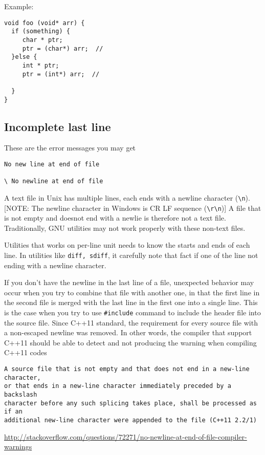 Example:
\begin{verbatim}
void foo (void* arr) {
  if (something) {
     char * ptr;  
     ptr = (char*) arr;  //
  }else {
     int * ptr;  
     ptr = (int*) arr;  //
  
  }
}
\end{verbatim}

\subsection{Incomplete last line}


These are the error messages you may get
\begin{verbatim}
No new line at end of file

\ No newline at end of file
\end{verbatim}

A text file in Unix has multiple lines, each ends with a newline character
(\verb!\n!). [NOTE: The newline character in Windows is CR LF sequence
(\verb!\r\n!)] A file that is not empty and doesnot end with a newlie is
therefore not a text file. Traditionally, GNU utilities may not work properly with these non-text files.

Utilities that works on per-line unit needs to know the starts and ends of each
line. In utilities like \verb!diff, sdiff!, it carefully note that fact if one
of the line not ending with a newline character. 

If you don't have the newline in the last line of a file, unexpected behavior
may occur when you try to combine that file with another one, in that the first
line in the second file is merged with the last line in the first one into a
single line. This is the case when you try to use \verb!#include! command to
include the header file into the source file. Since C++11 standard, the
requirement for every source file with a non-escaped newline was removed. In
other words, the compiler that support C++11 should be able to detect and not
producing the warning when compiling C++11 codes
\begin{verbatim}
A source file that is not empty and that does not end in a new-line character,
or that ends in a new-line character immediately preceded by a backslash
character before any such splicing takes place, shall be processed as if an
additional new-line character were appended to the file (C++11 2.2/1)  
\end{verbatim}

\url{http://stackoverflow.com/questions/72271/no-newline-at-end-of-file-compiler-warnings}

